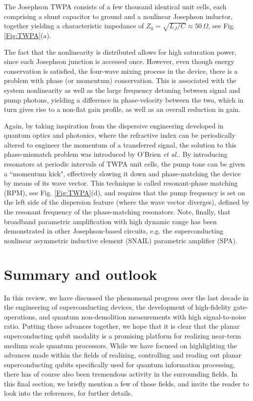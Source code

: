 \documentclass[aip,apr,twocolumn,showpacs,superscriptaddress,groupedaddress,nofootinbib,reprint]{revtex4-1}  %
\begin{document}
The Josephson TWPA consists of a few thousand identical unit cells, each comprising a shunt capacitor to ground and a nonlinear Josephson inductor, together yielding a characteristic impedance of $Z_0 = \sqrt{L_J/C} \approx 50\,\Omega$, see Fig. \ref{Fig:TWPA}(a).

The fact that the nonlinearity is distributed allows for high saturation power, since each Josephson junction is accessed once. However, even though energy conservation is satisfied, the four-wave mixing process in the device, there is a problem with phase (or momentum) conservation. This is associated with the system nonlinearity as well as the large frequency detuning between signal and pump photons, yielding a difference in phase-velocity between the two, which in turn gives rise to a non-flat gain profile, as well as an overall reduction in gain\cite{OBrien2014}.

Again, by taking inspiration from the dispersive engineering developed in quantum optics and photonics, where the refractive index can be periodically altered to engineer the momentum of a transferred signal, the solution to this phase-mismatch problem was introduced by O'Brien \textit{et al.}\cite{OBrien2014}. By introducing resonators at periodic intervals of TWPA unit cells, the pump tone can be given a ``momentum kick", effectively slowing it down and phase-matching the device by means of its wave vector. This technique is called resonant-phase matching (RPM), see Fig. \ref{Fig:TWPA}(d), and requires that the pump frequency is set on the left side of the dispersion feature (where the wave vector diverges), defined by the resonant frequency of the phase-matching resonators. Note, finally, that broadband parametric amplification with high dynamic range has been demonstrated in other Josephson-based circuits, e.g. the superconducting nonlinear asymmetric inductive element (SNAIL) parametric amplifier (SPA)\cite{Frattini2018}.

\section{Summary and outlook}
In this review, we have discussed the phenomenal progress over the last decade in the engineering of superconducting devices, the development of high-fidelity gate-operations, and quantum non-demolition measurements with high signal-to-noise ratio. Putting these advances together, we hope that it is clear that the planar superconducting qubit modality is a promising platform for realizing near-term medium scale quantum processors. While we have focused on highlighting the advances made within the fields of realizing, controlling and reading out planar superconducting qubits specifically used for quantum information processing, there has of course also been tremendous activity in the surrounding fields. In this final section, we briefly mention a few of those fields, and invite the reader to look into the references, for further details.
\end{document}
